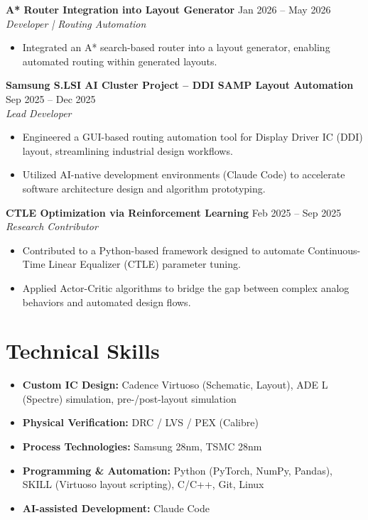 \documentclass[11pt,a4paper,sans]{article}
\begin{document}
\vspace{5pt}

\noindent\textbf{A* Router Integration into Layout Generator} \hfill Jan 2026 -- May 2026 \\
\textit{Developer | Routing Automation}
\begin{itemize}[leftmargin=*, noitemsep, topsep=2pt]
    \item Integrated an A* search-based router into a layout generator, enabling automated routing within generated layouts.
\end{itemize}

\vspace{5pt}

\noindent\textbf{Samsung S.LSI AI Cluster Project -- DDI SAMP Layout Automation} \hfill Sep 2025 -- Dec 2025 \\
\textit{Lead Developer}
\begin{itemize}[leftmargin=*, noitemsep, topsep=2pt]
    \item Engineered a GUI-based routing automation tool for Display Driver IC (DDI) layout, streamlining industrial design workflows.
    \item Utilized AI-native development environments (Claude Code) to accelerate software architecture design and algorithm prototyping.
\end{itemize}

\vspace{5pt}

\noindent\textbf{CTLE Optimization via Reinforcement Learning} \hfill Feb 2025 -- Sep 2025 \\
\textit{Research Contributor}
\begin{itemize}[leftmargin=*, noitemsep, topsep=2pt]
    \item Contributed to a Python-based framework designed to automate Continuous-Time Linear Equalizer (CTLE) parameter tuning.
    \item Applied Actor-Critic algorithms to bridge the gap between complex analog behaviors and automated design flows.
\end{itemize}

\section{Technical Skills}
\begin{itemize}[leftmargin=*]
    \item \textbf{Custom IC Design:} Cadence Virtuoso (Schematic, Layout), ADE L (Spectre) simulation, pre-/post-layout simulation
    \item \textbf{Physical Verification:} DRC / LVS / PEX (Calibre)
    \item \textbf{Process Technologies:} Samsung 28nm, TSMC 28nm
    \item \textbf{Programming \& Automation:} Python (PyTorch, NumPy, Pandas), SKILL (Virtuoso layout scripting), C/C++, Git, Linux
    \item \textbf{AI-assisted Development:} Claude Code
\end{itemize}
\end{document}
